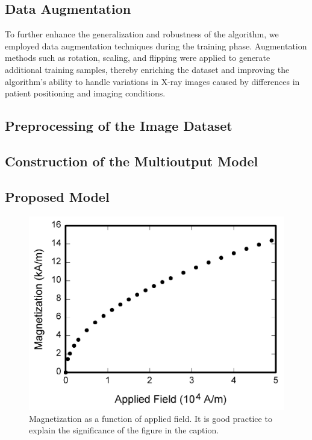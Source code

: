 \documentclass[journal,twoside,web]{ieeecolor}
\begin{document}
\subsection{Data Augmentation}

To further enhance the generalization and robustness of the algorithm, we employed data augmentation techniques during the training phase. Augmentation methods such as rotation, scaling, and flipping were applied to generate additional training samples, thereby enriching the dataset and improving the algorithm's ability to handle variations in X-ray images caused by differences in patient positioning and imaging conditions.


\subsection{Preprocessing of the Image Dataset}

\subsection{Construction of the Multioutput Model}

\subsection{Proposed Model}

\begin{figure}[!t]
\centerline{\includegraphics[width=\columnwidth]{fig1.png}}
\caption{Magnetization as a function of applied field.
It is good practice to explain the significance of the figure in the caption.}
\label{fig1}
\end{figure}
\end{document}
